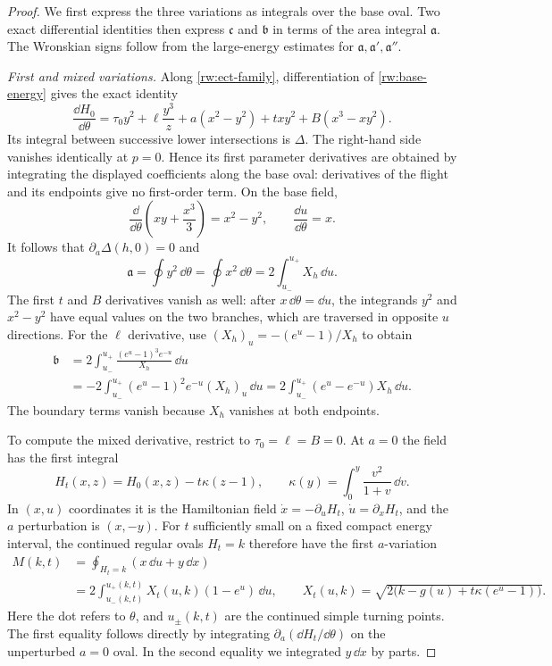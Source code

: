 \begin{proof}
We first express the three variations as integrals over the base oval.
Two exact differential identities then express $\mathfrak c$ and
$\mathfrak b$ in terms of the area integral $\mathfrak a$.
The Wronskian signs follow from the large-energy estimates for
$\mathfrak a,\mathfrak a',\mathfrak a''$.

\smallskip
\noindent\emph{First and mixed variations.}
Along \eqref{rw:ect-family}, differentiation of \eqref{rw:base-energy}
gives the exact identity
\begin{equation}\label{rw:ect-energy-variation}
 \frac{\dd H_0}{\dd\theta}
 =\tau_0y^2+\ell\frac{y^3}{z}
     +a(x^2-y^2)+txy^2+B(x^3-xy^2).
\end{equation}
Its integral between successive lower intersections is $\Delta$.
The right-hand side vanishes identically at $p=0$. Hence its first
parameter derivatives are obtained by integrating the displayed
coefficients along the base oval: derivatives of the flight and its
endpoints give no first-order term. On the base field,
\[
 \frac{\dd}{\dd\theta}\left(xy+\frac{x^3}{3}\right)=x^2-y^2,
 \qquad \frac{\dd u}{\dd\theta}=x.
\]
It follows that $\partial_a\Delta(h,0)=0$ and
\[
 \mathfrak a=\oint y^2\,\dd\theta
             =\oint x^2\,\dd\theta=2\int_{u_-}^{u_+}X_h\,\dd u.
\]
The first $t$ and $B$ derivatives vanish as well: after
$x\,\dd\theta=\dd u$, the integrands $y^2$ and $x^2-y^2$
have equal values on the two branches, which are traversed in
opposite $u$ directions.
For the $\ell$ derivative, use $(X_h)_u=-(e^u-1)/X_h$ to obtain
\[
 \begin{aligned}
 \mathfrak b
 &=2\int_{u_-}^{u_+}\frac{(e^u-1)^3e^{-u}}{X_h}\,\dd u\\
 &=-2\int_{u_-}^{u_+}(e^u-1)^2e^{-u}(X_h)_u\,\dd u
   =2\int_{u_-}^{u_+}(e^u-e^{-u})X_h\,\dd u.
 \end{aligned}
\]
The boundary terms vanish because $X_h$ vanishes at both endpoints.

To compute the mixed derivative, restrict to $\tau_0=\ell=B=0$.
At $a=0$ the field has the first integral
\[
 H_t(x,z)=H_0(x,z)-t\kappa(z-1),\qquad
 \kappa(y)=\int_0^y\frac{v^2}{1+v}\,\dd v.
\]
In $(x,u)$ coordinates it is the Hamiltonian field
$\dot x=-\partial_uH_t$, $\dot u=\partial_xH_t$, and the
$a$ perturbation is $(x,-y)$. For $t$ sufficiently small on a fixed
compact energy interval, the continued regular ovals $H_t=k$
therefore have the first $a$-variation
\begin{equation}\label{rw:ect-melnikov}
 \begin{aligned}
 M(k,t)&=\oint_{H_t=k}(x\,\dd u+y\,\dd x)\\
       &=2\int_{u_-(k,t)}^{u_+(k,t)}
          X_t(u,k)(1-e^u)\,\dd u,\qquad
 X_t(u,k)=\sqrt{2\bigl(k-g(u)+t\kappa(e^u-1)\bigr)}.
 \end{aligned}
\end{equation}
Here the dot refers to $\theta$, and $u_\pm(k,t)$ are the continued
simple turning points. The first equality follows directly by
integrating $\partial_a(\dd H_t/\dd\theta)$ on the unperturbed
$a=0$ oval. In the second equality we integrated $y\,\dd x$ by
parts.


\end{proof}
